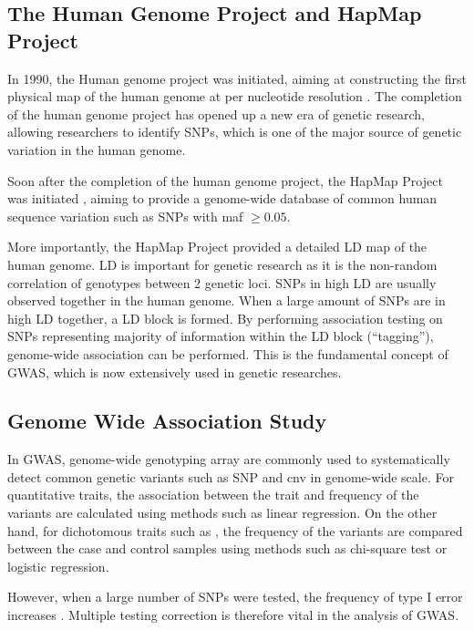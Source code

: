 	
	\subsection{The Human Genome Project and HapMap Project}
	In 1990, the Human genome project was initiated, aiming at constructing the first physical map of the human genome at per nucleotide resolution \citep{Lander2001}.
	The completion of the human genome project has opened up a new era of genetic research, allowing researchers to identify \glspl{SNP}, which is one of the major source of genetic variation in the human genome.
	
	Soon after the completion of the human genome project, the HapMap Project was initiated \citep{Consortium2005}, aiming to provide a genome-wide database of common human sequence variation such as \glspl{SNP} with \gls{maf} $\ge0.05$.
	
	More importantly, the HapMap Project provided a detailed \gls{LD} map of the human genome.
	\gls{LD} is important for genetic research as it is the non-random correlation of genotypes between 2 genetic loci. 
	\glspl{SNP} in high \gls{LD} are usually observed together in the human genome.
	When a large amount of \glspl{SNP} are in high \gls{LD} together, a \gls{LD} block is formed.
	By performing association testing on \glspl{SNP} representing majority of information within the \gls{LD} block (``tagging''), genome-wide association can be performed.
	This is the fundamental concept of \gls{GWAS}, which is now extensively used in genetic researches.
	
	\subsection{Genome Wide Association Study}
	In \gls{GWAS}, genome-wide genotyping array are commonly used to systematically detect common genetic variants such as \gls{SNP} and \gls{cnv} in genome-wide scale.
	For quantitative traits, the association between the trait and frequency of the variants are calculated using methods such as linear regression.
	On the other hand, for dichotomous traits such as , the frequency of the variants are compared between the case and control samples using methods such as chi-square test or logistic regression.
	
	However, when a large number of \glspl{SNP} were tested, the frequency of type I error increases \citep{Peters2010}.
	Multiple testing correction is therefore vital in the analysis of \gls{GWAS}.
	

